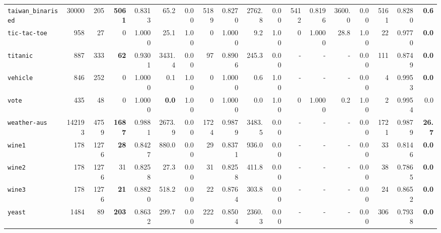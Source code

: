 \begin{tabular}{lccrrrrrrrrrrrrrrr}
\texttt{taiwan\_binarised} & \multicolumn{1}{r}{30000} & \multicolumn{1}{r}{205}  & \textbf{5061} & 0.8313 & 65.2 & 0.00 & 5189 & 0.8270 & 2762.8 & 0.00 & 5412 & 0.8196 & 3600.0 & 0.00 & 5161 & 0.8280 & \textbf{0.6}\\
\texttt{tic-tac-toe} & \multicolumn{1}{r}{958} & \multicolumn{1}{r}{27}  & 0 & 1.0000 & 25.1 & 1.00 & 0 & 1.0000 & 9.2 & 1.00 & 0 & 1.0000 & 28.8 & 1.00 & 22 & 0.9770 & \textbf{0.0}\\
\texttt{titanic} & \multicolumn{1}{r}{887} & \multicolumn{1}{r}{333}  & \textbf{62} & 0.9301 & 3431.4 & 0.00 & 97 & 0.8906 & 245.3 & 0.00 & - & - & - & 0.00 & 111 & 0.8749 & \textbf{0.0}\\
\texttt{vehicle} & \multicolumn{1}{r}{846} & \multicolumn{1}{r}{252}  & 0 & 1.0000 & 0.1 & 1.00 & 0 & 1.0000 & 0.6 & 1.00 & - & - & - & 0.00 & 4 & 0.9953 & \textbf{0.0}\\
\texttt{vote} & \multicolumn{1}{r}{435} & \multicolumn{1}{r}{48}  & 0 & 1.0000 & \textbf{0.0} & 1.00 & 0 & 1.0000 & 0.0 & 1.00 & 0 & 1.0000 & 0.2 & 1.00 & 2 & 0.9954 & 0.0\\
\texttt{weather-aus} & \multicolumn{1}{r}{142193} & \multicolumn{1}{r}{4759}  & \textbf{1687} & 0.9881 & 2673.9 & 0.00 & 1724 & 0.9879 & 3483.5 & 0.00 & - & - & - & 0.00 & 1721 & 0.9879 & \textbf{26.7}\\
\texttt{wine1} & \multicolumn{1}{r}{178} & \multicolumn{1}{r}{1276}  & \textbf{28} & 0.8427 & 880.0 & 0.00 & 29 & 0.8371 & 936.0 & 0.00 & - & - & - & 0.00 & 33 & 0.8146 & \textbf{0.0}\\
\texttt{wine2} & \multicolumn{1}{r}{178} & \multicolumn{1}{r}{1276}  & 31 & 0.8258 & 27.3 & 0.00 & 31 & 0.8258 & 411.8 & 0.00 & - & - & - & 0.00 & 38 & 0.7865 & \textbf{0.0}\\
\texttt{wine3} & \multicolumn{1}{r}{178} & \multicolumn{1}{r}{1276}  & \textbf{21} & 0.8820 & 518.2 & 0.00 & 22 & 0.8764 & 303.8 & 0.00 & - & - & - & 0.00 & 24 & 0.8652 & \textbf{0.0}\\
\texttt{yeast} & \multicolumn{1}{r}{1484} & \multicolumn{1}{r}{89}  & \textbf{203} & 0.8632 & 299.7 & 0.00 & 222 & 0.8504 & 2360.3 & 0.00 & - & - & - & 0.00 & 306 & 0.7938 & \textbf{0.0}\\
\bottomrule
\end{tabular}
